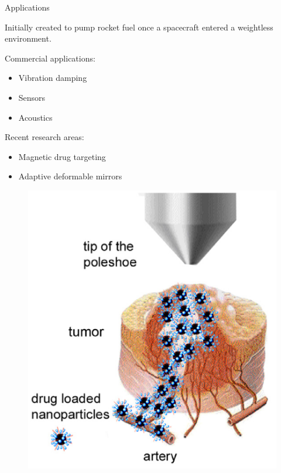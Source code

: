 \documentclass[9pt]{beamer}
\begin{document}
\begin{frame}{Applications}
	\begin{itemize}
		\item Initially created to pump rocket fuel once a spacecraft entered a weightless environment.
		\begin{minipage}{.5\paperwidth}
			\item Commercial applications:
			\begin{itemize}
				\item Vibration damping
				\item Sensors
				\item Acoustics
			\end{itemize}
			\item Recent research areas:
			\begin{itemize}
				\item Magnetic drug targeting
				\item Adaptive deformable mirrors
			\end{itemize}
		\end{minipage}%
		\begin{minipage}{.3\paperwidth}
			\begin{figure}[!b]
				\centering
				\includegraphics[scale=.7]{DrugTarget.png}
			\end{figure}
		\end{minipage}%
	\end{itemize}
\end{frame}
\end{document}

